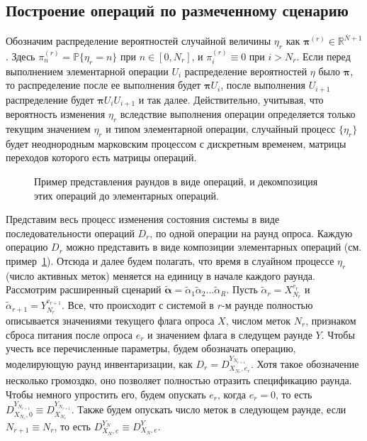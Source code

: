 \subsection{Построение операций по размеченному сценарию}\label{subsec:ch3_bg_round_op_matrices}
Обозначим распределение вероятностей случайной величины $\eta_r$ как $\bm{\pi}^{(r)} \in \mathbb{R}^{\overline{N}+1}$. Здесь $\pi_n^{(r)} = \mathbb{P}\{\eta_r = n \}$ при $n \in [0, N_r]$, и $\pi_i^{(r)} \equiv 0$ при $i > N_r$. Если перед выполнением элементарной операции $U_i$ распределение вероятностей $\eta$ было $\bm{\pi}$, то распределение после ее выполнения будет $\bm{\pi}U_i$, после выполнения $U_{i+1}$ распределение будет $\bm{\pi} U_i U_{i+1}$ и так далее. Действительно, учитывая, что вероятность изменения $\eta_r$ вследствие выполнения операции определяется только текущим значением $\eta_r$ и типом элементарной операции, случайный процесс $\{ \eta_r \}$ будет неоднородным марковским процессом с дискретным временем, матрицы переходов которого есть матрицы операций.

\begin{figure}[htb]
  \caption{Пример представления раундов в виде операций, и декомпозиция этих операций до элементарных операций.}
  \label{fig:ch3_decomposition}
\end{figure}

Представим весь процесс изменения состояния системы в виде последовательности операций $D_r$, по одной операции на раунд опроса. Каждую операцию $D_r$ можно представить в виде композиции элементарных операций (см. пример~\ref{fig:ch3_decomposition}). Отсюда и далее будем полагать, что время в слуайном процессе $\eta_r$ (число активных меток) меняется на единицу в начале каждого раунда. Рассмотрим расширенный сценарий $\widetilde{\bm{\alpha}} = \widetilde{\alpha}_1 \widetilde{\alpha}_2 \dots \widetilde{\alpha}_R$. Пусть $\widetilde{\alpha}_r = X_{N_r}^{e_r}$ и $\widetilde{\alpha}_{r+1} = Y_{N_r}^{e_{r+1}}$. Все, что происходит с системой в $r$-м раунде полностью описывается значениями текущего флага опроса $X$, числом меток $N_r$, признаком сброса питания после опроса $e_r$ и значением флага в следущем раунде $Y$. Чтобы учесть все перечисленные параметры, будем обозначать операцию, моделирующую раунд инвентаризации, как $D_r = D_{X_{N_r},e_r}^{Y_{N_{r+1}}}$. Хотя такое обозначение несколько громоздко, оно позволяет полностью отразить спецификацию раунда. Чтобы немного упростить его, будем опускать $e_r$, когда $e_r = 0$, то есть $D_{X_{N_r},0}^{Y_{N_{r+1}}} \equiv D_{X_{N_r}}^{Y_{N_{r+1}}}$. Также будем опускать число меток в следующем раунде, если $N_{r+1} \equiv N_r$, то есть $D_{X_N,e}^{Y_N} \equiv D_{X_N,e}^Y$.

